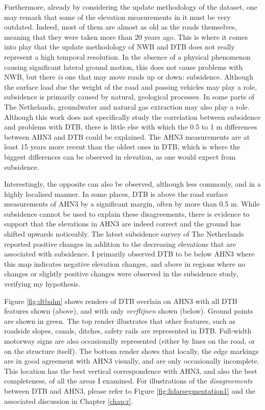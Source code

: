 Furthermore, already by considering the update methodology of the dataset, one may remark that some of the elevation measurements in it must be very outdated. Indeed, most of them are almost as old as the roads themselves, meaning that they were taken more than 20 years ago. This is where it comes into play that the update methodology of NWB and DTB does not really represent a high temporal resolution. In the absence of a physical phenomenon causing significant lateral ground motion, this does not cause problems with NWB, but there \textit{is} one that may move roads up or down: subsidence. Although the surface load due the weight of the road and passing vehicles may play a role, subsidence is primarily caused by natural, geological processes. In some parts of The Nethelands, groundwater and natural gas extraction may also play a role. Although this work does not specifically study the correlation between subsidence and problems with DTB, there is little else with which the 0.5 to 1 m differences between AHN3 and DTB could be explained. The AHN3 measurements are at least 15 years more recent than the oldest ones in DTB, which is where the biggest differences can be observed in elevation, as one would expect from subsidence.

Interestingly, the opposite can also be observed, although less commonly, and in a highly localised manner. In some places, DTB is above the road surface measurements of AHN3 by a significant margin, often by more than 0.5 m. While subsidence cannot be used to explain these disagreements, there is evidence to support that the elevations in AHN3 are indeed correct and the ground has shifted upwards noticeably. The latest subsidence survey of The Netherlands reported positive changes in addition to the decreasing elevations that are associated with subsidence. I primarily observed DTB to be below AHN3 where this map indicates negative elevation changes, and above in regions where no changes or slightly positive changes were observed in the subsidence study, verifying my hypothesis.

Figure \ref{fig:dtbahn} shows renders of DTB overlain on AHN3 with all DTB features shown (above), and with only \textit{verflijnen} shown (below). Ground points are shown in green. The top render illustrates that other features, such as roadside slopes, canals, ditches, safety rails are represented in DTB. Full-width motorway signs are also occasionally represented (either by lines on the road, or on the structure itself). The bottom render shows that locally, the edge markings are in good agreement with AHN3 visually, and are only occasionally incomplete. This location has the best vertical correspondence with AHN3, and also the best completeness, of all the areas I examined. For illustrations of the \textit{disagreements} between DTB and AHN3, please refer to Figure \ref{fig:lidarsegmentation1} and the associated discussion in Chapter \ref{chap:r}.

